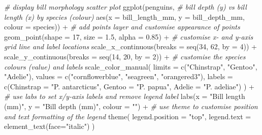 \documentclass[
]{book}
\newenvironment{Shaded}{\begin{snugshade}}{\end{snugshade}}
\newcommand{\AttributeTok}[1]{\textcolor[rgb]{0.77,0.63,0.00}{#1}}
\newcommand{\CommentTok}[1]{\textcolor[rgb]{0.56,0.35,0.01}{\textit{#1}}}
\newcommand{\DecValTok}[1]{\textcolor[rgb]{0.00,0.00,0.81}{#1}}
\newcommand{\FloatTok}[1]{\textcolor[rgb]{0.00,0.00,0.81}{#1}}
\newcommand{\FunctionTok}[1]{\textcolor[rgb]{0.00,0.00,0.00}{#1}}
\newcommand{\NormalTok}[1]{#1}
\newcommand{\SpecialCharTok}[1]{\textcolor[rgb]{0.00,0.00,0.00}{#1}}
\newcommand{\StringTok}[1]{\textcolor[rgb]{0.31,0.60,0.02}{#1}}
\begin{document}
\begin{Shaded}
\begin{Highlighting}[]
\CommentTok{\# display bill morphology scatter plot}
\FunctionTok{ggplot}\NormalTok{(penguins, }
       \CommentTok{\# bill depth (y) vs bill length (x) by species (colour)}
       \FunctionTok{aes}\NormalTok{(}\AttributeTok{x =}\NormalTok{ bill\_length\_mm, }\AttributeTok{y =}\NormalTok{ bill\_depth\_mm, }\AttributeTok{colour =}\NormalTok{ species)) }\SpecialCharTok{+} 
  \CommentTok{\# add points layer and customise appearance of points}
  \FunctionTok{geom\_point}\NormalTok{(}\AttributeTok{shape =} \DecValTok{17}\NormalTok{, }\AttributeTok{size =} \FloatTok{1.5}\NormalTok{, }\AttributeTok{alpha =} \FloatTok{0.85}\NormalTok{) }\SpecialCharTok{+} 
  \CommentTok{\# customise x{-} and y{-}axis grid line and label locations}
  \FunctionTok{scale\_x\_continuous}\NormalTok{(}\AttributeTok{breaks =} \FunctionTok{seq}\NormalTok{(}\DecValTok{34}\NormalTok{, }\DecValTok{62}\NormalTok{, }\AttributeTok{by =} \DecValTok{4}\NormalTok{)) }\SpecialCharTok{+}
  \FunctionTok{scale\_y\_continuous}\NormalTok{(}\AttributeTok{breaks =} \FunctionTok{seq}\NormalTok{(}\DecValTok{14}\NormalTok{, }\DecValTok{20}\NormalTok{, }\AttributeTok{by =} \DecValTok{2}\NormalTok{)) }\SpecialCharTok{+} 
  \CommentTok{\# customise the species colours (\textquotesingle{}value\textquotesingle{}) and labels}
  \FunctionTok{scale\_color\_manual}\NormalTok{(}
    \AttributeTok{limits =} \FunctionTok{c}\NormalTok{(}\StringTok{"Chinstrap"}\NormalTok{, }\StringTok{"Gentoo"}\NormalTok{, }\StringTok{"Adelie"}\NormalTok{),}
    \AttributeTok{values =} \FunctionTok{c}\NormalTok{(}\StringTok{"cornflowerblue"}\NormalTok{, }\StringTok{"seagreen"}\NormalTok{, }\StringTok{"orangered3"}\NormalTok{),}
    \AttributeTok{labels =} \FunctionTok{c}\NormalTok{(}\AttributeTok{Chinstrap =} \StringTok{"P. antarcticus"}\NormalTok{, }\AttributeTok{Gentoo =} \StringTok{"P. papua"}\NormalTok{, }\AttributeTok{Adelie =} \StringTok{"P. adeliae"}\NormalTok{)}
\NormalTok{  ) }\SpecialCharTok{+}
  \CommentTok{\# use \textasciigrave{}labs\textasciigrave{} to set x/y{-}axis labels and remove legend label}
  \FunctionTok{labs}\NormalTok{(}\AttributeTok{x =} \StringTok{"Bill length (mm)"}\NormalTok{, }\AttributeTok{y =} \StringTok{"Bill depth (mm)"}\NormalTok{, }\AttributeTok{colour =} \StringTok{""}\NormalTok{) }\SpecialCharTok{+}
  \CommentTok{\# use theme to customise position and text formatting of the legend}
  \FunctionTok{theme}\NormalTok{(}
    \AttributeTok{legend.position =} \StringTok{"top"}\NormalTok{,}
    \AttributeTok{legend.text =} \FunctionTok{element\_text}\NormalTok{(}\AttributeTok{face=}\StringTok{"italic"}\NormalTok{)}
\NormalTok{  )}
\end{Highlighting}
\end{Shaded}
\end{document}
